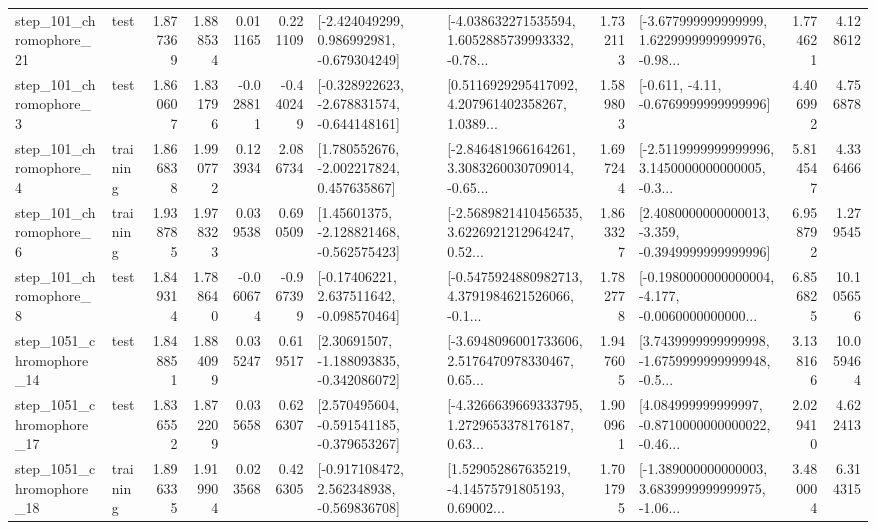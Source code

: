 \begin{tabular}{llrrrrllrlrr}
  step\_101\_chromophore\_21 &      test &      1.877369 &    1.888534 &      0.011165 &  0.221109 &   [-2.424049299, 0.986992981, -0.679304249] &  [-4.038632271535594, 1.6052885739993332, -0.78... &       1.732113 &  [-3.677999999999999, 1.6229999999999976, -0.98... &            1.774621 &          4.128612 \\
   step\_101\_chromophore\_3 &      test &      1.860607 &    1.831796 &     -0.028811 & -0.440249 &  [-0.328922623, -2.678831574, -0.644148161] &  [0.5116929295417092, 4.207961402358267, 1.0389... &       1.589803 &               [-0.611, -4.11, -0.6769999999999996] &            4.406992 &          4.756878 \\
   step\_101\_chromophore\_4 &  training &      1.866838 &    1.990772 &      0.123934 &  2.086734 &    [1.780552676, -2.002217824, 0.457635867] &  [-2.846481966164261, 3.3083260030709014, -0.65... &       1.697244 &  [-2.5119999999999996, 3.1450000000000005, -0.3... &            5.814547 &          4.336466 \\
   step\_101\_chromophore\_6 &  training &      1.938785 &    1.978323 &      0.039538 &  0.690509 &    [1.45601375, -2.128821468, -0.562575423] &  [-2.5689821410456535, 3.6226921212964247, 0.52... &       1.863327 &  [2.4080000000000013, -3.359, -0.3949999999999996] &            6.958792 &          1.279545 \\
   step\_101\_chromophore\_8 &      test &      1.849314 &    1.788640 &     -0.060674 & -0.967399 &    [-0.17406221, 2.637511642, -0.098570464] &  [-0.5475924880982713, 4.3791984621526066, -0.1... &       1.782778 &  [-0.1980000000000004, -4.177, -0.0060000000000... &            6.856825 &         10.105656 \\
 step\_1051\_chromophore\_14 &      test &      1.848851 &    1.884099 &      0.035247 &  0.619517 &    [2.30691507, -1.188093835, -0.342086072] &  [-3.6948096001733606, 2.5176470978330467, 0.65... &       1.947605 &  [3.7439999999999998, -1.6759999999999948, -0.5... &            3.138166 &         10.059464 \\
 step\_1051\_chromophore\_17 &      test &      1.836552 &    1.872209 &      0.035658 &  0.626307 &   [2.570495604, -0.591541185, -0.379653267] &  [-4.3266639669333795, 1.2729653378176187, 0.63... &       1.900961 &  [4.084999999999997, -0.8710000000000022, -0.46... &            2.029410 &          4.622413 \\
 step\_1051\_chromophore\_18 &  training &      1.896335 &    1.919904 &      0.023568 &  0.426305 &   [-0.917108472, 2.562348938, -0.569836708] &  [1.529052867635219, -4.14575791805193, 0.69002... &       1.701795 &  [-1.389000000000003, 3.6839999999999975, -1.06... &            3.480004 &          6.314315 \\

\end{tabular}
